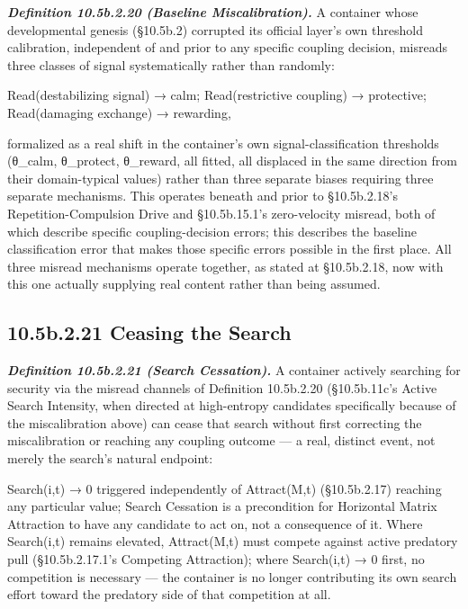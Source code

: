 \documentclass[
]{article}
\begin{document}
\emph{\textbf{Definition 10.5b.2.20 (Baseline Miscalibration).}} A
container whose developmental genesis (§10.5b.2) corrupted its official
layer's own threshold calibration, independent of and prior to any
specific coupling decision, misreads three classes of signal
systematically rather than randomly:

Read(destabilizing signal) → calm; Read(restrictive coupling) →
protective; Read(damaging exchange) → rewarding,

formalized as a real shift in the container's own signal-classification
thresholds (θ\_calm, θ\_protect, θ\_reward, all fitted, all displaced in
the same direction from their domain-typical values) rather than three
separate biases requiring three separate mechanisms. This operates
beneath and prior to §10.5b.2.18's Repetition-Compulsion Drive and
§10.5b.15.1's zero-velocity misread, both of which describe specific
coupling-decision errors; this describes the baseline classification
error that makes those specific errors possible in the first place. All
three misread mechanisms operate together, as stated at §10.5b.2.18, now
with this one actually supplying real content rather than being assumed.

\hypertarget{b.2.21-ceasing-the-search}{%
\subsection{10.5b.2.21 Ceasing the
Search}\label{b.2.21-ceasing-the-search}}

\emph{\textbf{Definition 10.5b.2.21 (Search Cessation).}} A container
actively searching for security via the misread channels of Definition
10.5b.2.20 (§10.5b.11c's Active Search Intensity, when directed at
high-entropy candidates specifically because of the miscalibration
above) can cease that search without first correcting the miscalibration
or reaching any coupling outcome --- a real, distinct event, not merely
the search's natural endpoint:

Search(i,t) → 0 triggered independently of Attract(M,t) (§10.5b.2.17)
reaching any particular value; Search Cessation is a precondition for
Horizontal Matrix Attraction to have any candidate to act on, not a
consequence of it. Where Search(i,t) remains elevated, Attract(M,t) must
compete against active predatory pull (§10.5b.2.17.1's Competing
Attraction); where Search(i,t) → 0 first, no competition is necessary
--- the container is no longer contributing its own search effort toward
the predatory side of that competition at all.
\end{document}
